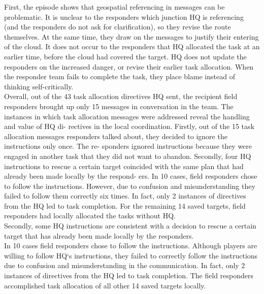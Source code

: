First, the episode shows that geospatial referencing in messages can be problematic. It is unclear to the responders which junction HQ is referencing (and the responders do not ask for clarification), so they revise the route themselves. At the same time, they draw on the messages to justify their entering of the cloud. It does not occur to the responders that HQ allocated the task at an earlier time, before the cloud had covered the target. HQ does not update the responders on the increased danger, or revise their earlier task allocation. When the responder team fails to complete the task, they place blame instead of thinking self-critically.\\

Overall, out of the 43 task allocation directives HQ sent, the recipient field responders brought up only 15 messages in conversation in the team. The instances in which task allocation messages were addressed reveal the handling and value of HQ di- rectives in the local coordination. Firstly, out of the 15 task allocation messages responders talked about, they decided to ignore the instructions only once. The re- sponders ignored instructions because they were engaged in another task that they did not want to abandon. Secondly, four HQ instructions to rescue a certain target coincided with the same plan that had already been made locally by the respond- ers. In 10 cases, field responders chose to follow the instructions. However, due to confusion and misunderstanding they failed to follow them correctly six times. In fact, only 2 instances of directives from the HQ led to task completion. For the remaining 14 saved targets, field responders had locally allocated the tasks without HQ.\\

Secondly, some HQ instructions are consistent with a decision to rescue a certain target that has already been made locally by the responders.\\

In 10 cases field responders chose to follow the instructions. Although players are willing to follow HQ`s instructions, they failed to correctly follow the instructions due to confusion and misunderstanding in the communication. In fact, only 2 instances of directives from the HQ led to task completion. The field responders accomplished task allocation of all other 14 saved targets locally.\\


